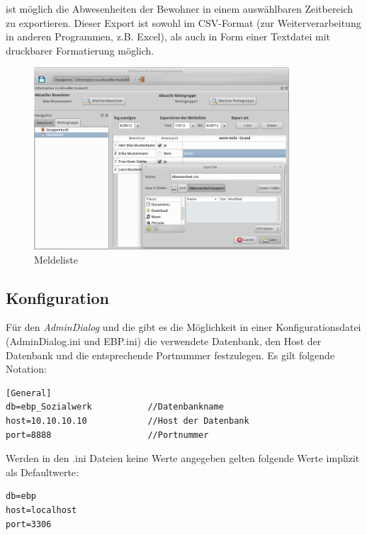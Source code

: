 \begin{itemize}
ist möglich die Abwesenheiten der Bewohner in einem auswählbaren Zeitbereich zu exportieren. Dieser Export ist sowohl im CSV-Format (zur
Weiterverarbeitung in anderen Programmen, z.B. Excel), als auch in Form einer Textdatei mit druckbarer Formatierung möglich.
	\begin{figure}[h]
		\begin{center}
			\includegraphics[keepaspectratio=true, width=0.85\textwidth]{pics/client_meldeliste.png}
			\caption{Meldeliste}
		\end{center}
	\end{figure}
	\FloatBarrier
\end{itemize}
\newpage

\subsection{Konfiguration}
Für den \textit{AdminDialog} und die \EBP gibt es die Möglichkeit in einer Konfigurationsdatei (AdminDialog.ini und EBP.ini) die verwendete Datenbank,
den Host der Datenbank und die entsprechende Portnummer festzulegen. Es gilt folgende Notation:
\begin{lstlisting}
[General]
db=ebp_Sozialwerk			//Datenbankname
host=10.10.10.10			//Host der Datenbank
port=8888					//Portnummer	
\end{lstlisting}
Werden in den .ini Dateien keine Werte angegeben gelten folgende Werte implizit als Defaultwerte:
\begin{lstlisting}
db=ebp
host=localhost
port=3306
\end{lstlisting}
